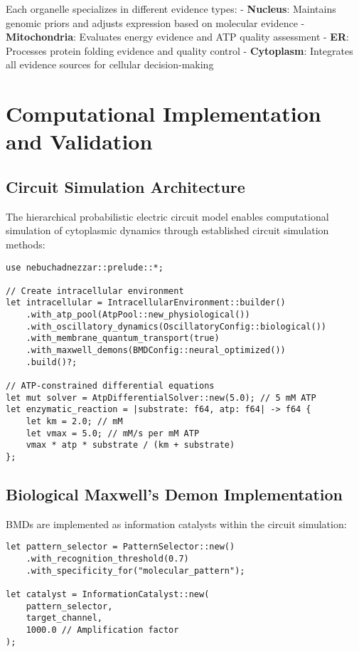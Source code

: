 \documentclass[12pt,a4paper]{article}
\begin{document}
Each organelle specializes in different evidence types:
- \textbf{Nucleus}: Maintains genomic priors and adjusts expression based on molecular evidence
- \textbf{Mitochondria}: Evaluates energy evidence and ATP quality assessment
- \textbf{ER}: Processes protein folding evidence and quality control
- \textbf{Cytoplasm}: Integrates all evidence sources for cellular decision-making

\section{Computational Implementation and Validation}

\subsection{Circuit Simulation Architecture}

The hierarchical probabilistic electric circuit model enables computational simulation of cytoplasmic dynamics through established circuit simulation methods:

\begin{lstlisting}[style=pythonstyle, caption=Intracellular Circuit Implementation]
use nebuchadnezzar::prelude::*;

// Create intracellular environment
let intracellular = IntracellularEnvironment::builder()
    .with_atp_pool(AtpPool::new_physiological())
    .with_oscillatory_dynamics(OscillatoryConfig::biological())
    .with_membrane_quantum_transport(true)
    .with_maxwell_demons(BMDConfig::neural_optimized())
    .build()?;

// ATP-constrained differential equations
let mut solver = AtpDifferentialSolver::new(5.0); // 5 mM ATP
let enzymatic_reaction = |substrate: f64, atp: f64| -> f64 {
    let km = 2.0; // mM
    let vmax = 5.0; // mM/s per mM ATP
    vmax * atp * substrate / (km + substrate)
};
\end{lstlisting}

\subsection{Biological Maxwell's Demon Implementation}

BMDs are implemented as information catalysts within the circuit simulation:

\begin{lstlisting}[style=pythonstyle, caption=BMD Implementation]
let pattern_selector = PatternSelector::new()
    .with_recognition_threshold(0.7)
    .with_specificity_for("molecular_pattern");

let catalyst = InformationCatalyst::new(
    pattern_selector, 
    target_channel, 
    1000.0 // Amplification factor
);
\end{lstlisting}
\end{document}
